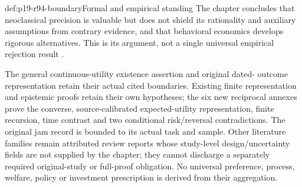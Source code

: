 \begin{proofboundary}{def:p19-r94-boundary}{Formal and empirical standing}
The chapter concludes that neoclassical precision is valuable but does
not shield its rationality and auxiliary assumptions from contrary
evidence, and that behavioral economics develops rigorous alternatives.
This is its argument, not a single universal empirical rejection result
\cite[p.~574]{DhamiAlNowaihi2021Economics}.

The general continuous-utility existence assertion and original dated-
outcome representation retain their actual cited boundaries. Existing
finite representation and epistemic proofs retain their own hypotheses;
the six new reciprocal annexes prove the converse, source-calibrated
expected-utility representation, finite recursion,
time contrast and two conditional risk/reversal contradictions. The
original jam record is bounded to its actual task and sample. Other
literature families remain attributed review reports whose study-level
design/uncertainty fields are not supplied by the chapter; they cannot
discharge a separately required original-study or full-proof obligation.
No universal preference, process, welfare, policy or investment prescription
is derived from their aggregation.
\end{proofboundary}
